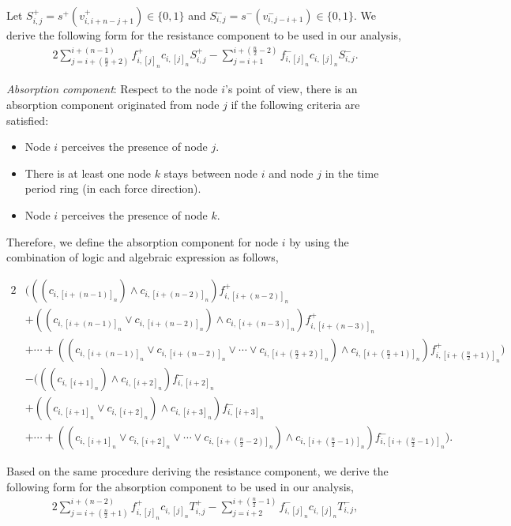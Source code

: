 Let $S_{i,j}^{+} = s^+(v_{i,i+n-j+1}^+) \in \lbrace 0,1 \rbrace$ and $S_{i,j}^{-} = s^-(v_{i,j-i+1}^-) \in \lbrace 0,1 \rbrace$. We derive the following form for the resistance component to be used in our analysis,
\begin{alignat}{2}
\sum_{j=i+(\frac{n}{2}+2)}^{i + (n-1)}f_{i,[j]_n}^{+}c_{i,[j]_n}S_{i,j}^{+} - \sum_{j=i+1}^{i + (\frac{n}{2}-2)}f_{i,[j]_n}^{-}c_{i,[j]_n}S_{i,j}^{-}.
\end{alignat}

\textit{Absorption component}:  
Respect to the node $i$'s point of view, there is an absorption component originated from node $j$ if the following criteria are satisfied:
\begin{itemize}
\item Node $i$ perceives the presence of node $j$.
\item There is at least one node $k$ stays between node $i$ and node $j$ in the time period ring (in each force direction). 
\item Node $i$ perceives the presence of node $k$.
\end{itemize}

Therefore, we define the absorption component for node $i$ by using the combination of logic and algebraic expression as follows,

\begin{alignat}{2}
&\Bigg(((c_{i,[i+(n-1)]_n})
    \land c_{i,[i+(n-2)]_n}) f_{i,[i+(n-2)]_n}^{+} \nonumber \\
  &+ ((c_{i,[i+(n-1)]_n} \lor c_{i,[i+(n-2)]_n})
    \land c_{i,[i+(n-3)]_n}) f_{i,[i+(n-3)]_n}^{+} \nonumber \\
  &+ \cdots + ((c_{i,[i+(n-1)]_n} \lor c_{i,[i+(n-2)]_n} \lor \cdots \lor c_{i,[i+(\frac{n}{2} + 2)]_n})\land c_{i,[i+(\frac{n}{2}+1)]_n})f_{i,[i+(\frac{n}{2}+1)]_n}^{+}\Bigg) \nonumber \\
&-\Bigg(((c_{i,[i+1]_n})
    \land c_{i,[i+2]_n})  f_{i,[i+2]_n}^{-} \nonumber \\
  &+ ((c_{i,[i+1]_n} \lor c_{i,[i+2]_n})
    \land c_{i,[i+3]_n})  f_{i,[i+3]_n}^{-} \nonumber \\
  &+ \cdots + ((c_{i,[i+1]_n} \lor c_{i,[i+2]_n} \lor \cdots \lor c_{i,[i+(\frac{n}{2} - 2)]_n}) \land c_{i,[i+(\frac{n}{2}-1)]_n})f_{i,[i+(\frac{n}{2}-1)]_n}^{-}\Bigg).
\label{eq:logicalor2}
\end{alignat}

Based on the same procedure deriving the resistance component, we derive the following form for the absorption component to be used in our analysis,
\begin{alignat}{2}
\sum_{j=i+(\frac{n}{2}+1)}^{i + (n-2)}f_{i,[j]_n}^{+}c_{i,[j]_n}T_{i,j}^{+} - \sum_{j=i+2}^{i + (\frac{n}{2}-1)}f_{i,[j]_n}^{-}c_{i,[j]_n}T_{i,j}^{-},
\end{alignat}


